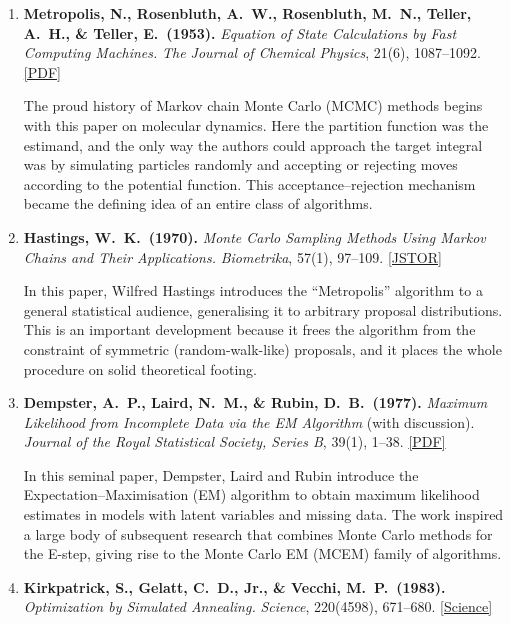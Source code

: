 \documentclass[12pt, a4paper]{article}
\begin{document}
\begin{enumerate}

\item \textbf{Metropolis, N., Rosenbluth, A.~W., Rosenbluth, M.~N., Teller, A.~H., \& Teller, E.\ (1953).}
\textit{Equation of State Calculations by Fast Computing Machines.}
\textit{The Journal of Chemical Physics}, 21(6), 1087--1092.
\href{https://bayes.wustl.edu/Manual/EquationOfState.pdf}{[PDF]}

The proud history of Markov chain Monte Carlo (MCMC) methods begins with this paper on molecular dynamics.
Here the partition function was the estimand, and the only way the authors could approach the target integral was by simulating particles randomly and accepting or rejecting moves according to the potential function.
This acceptance--rejection mechanism became the defining idea of an entire class of algorithms.

\item \textbf{Hastings, W.~K.\ (1970).}
\textit{Monte Carlo Sampling Methods Using Markov Chains and Their Applications.}
\textit{Biometrika}, 57(1), 97--109.
\href{https://www.jstor.org/stable/2334940}{[JSTOR]}

In this paper, Wilfred Hastings introduces the ``Metropolis'' algorithm to a general statistical audience, generalising it to arbitrary proposal distributions.
This is an important development because it frees the algorithm from the constraint of symmetric (random-walk-like) proposals, and it places the whole procedure on solid theoretical footing.

\item \textbf{Dempster, A.~P., Laird, N.~M., \& Rubin, D.~B.\ (1977).}
\textit{Maximum Likelihood from Incomplete Data via the EM Algorithm} (with discussion).
\textit{Journal of the Royal Statistical Society, Series B}, 39(1), 1--38.
\href{http://web.mit.edu/6.435/www/Dempster77.pdf}{[PDF]}

In this seminal paper, Dempster, Laird and Rubin introduce the Expectation--Maximisation (EM) algorithm to obtain maximum likelihood estimates in models with latent variables and missing data.
The work inspired a large body of subsequent research that combines Monte Carlo methods for the E-step, giving rise to the Monte Carlo EM (MCEM) family of algorithms.

\item \textbf{Kirkpatrick, S., Gelatt, C.~D., Jr., \& Vecchi, M.~P.\ (1983).}
\textit{Optimization by Simulated Annealing.}
\textit{Science}, 220(4598), 671--680.
\href{https://science.sciencemag.org/content/220/4598/671}{[Science]}


\end{enumerate}
\end{document}
